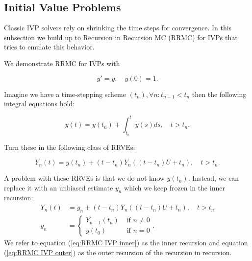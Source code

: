 \documentclass[a4paper,12pt]{article}
\begin{document}
\subsection{Initial Value Problems}
Classic IVP solvers rely on shrinking the time steps for
convergence. In this subsection we build up to
Recursion in Recursion MC (RRMC) for IVPs that tries to emulate
this behavior.


\begin{example}[RRMC $y'=y$] \label{ex:RRMC IVP}
    We demonstrate RRMC for IVPs with

    \begin{equation}
        y' = y, \quad y(0) = 1.
    \end{equation}

    Imagine we have a time-stepping scheme $(t_{n}), \forall n: t_{n-1} < t_{n}$
    then the following integral equations hold:

    \begin{equation}
        y(t)= y(t_{n}) + \int_{t_{n}}^{t}y(s)ds , \quad t>t_{n}.
    \end{equation}

    Turn these in the following class of RRVEs:

    \begin{equation}
        Y_{n}(t) = y(t_{n}) + (t-t_{n})Y_{n}((t-t_{n})U+t_{n}), \quad t>t_{n}.
    \end{equation}

    A problem with these RRVEs is that we do not know $y(t_{n})$.
    Instead, we can replace it with an unbiased estimate $y_{n}$
    which we keep frozen in the inner recursion:
    \begin{align}
        \label{eq:RRMC IVP inner}
        Y_{n}(t) & = y_{n} + (t-t_{n})Y_{n}((t-t_{n})U+t_{n}), \quad t>t_{n} \\
        y_{n}    & = \begin{cases}
                         Y_{n-1}(t_{n}) & \text{ if } n \neq 0 \\
                         y(t_{0})       & \text{ if } n = 0
                     \end{cases}.
        \label{eq:RRMC IVP outer}
    \end{align}
    We refer to equation (\ref{eq:RRMC IVP inner}) as the inner recursion and
    equation (\ref{eq:RRMC IVP outer}) as the outer recursion of the recursion in
    recursion.
\end{example}
\end{document}

